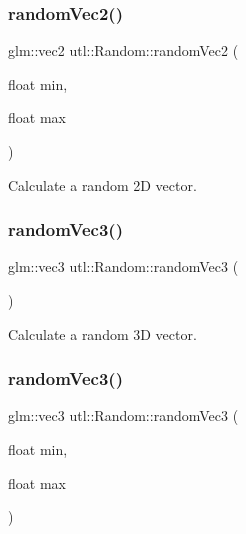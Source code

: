 \subsubsection{\texorpdfstring{random\+Vec2()}{randomVec2()}\hspace{0.1cm}{\footnotesize\ttfamily [2/2]}}
{\footnotesize\ttfamily glm\+::vec2 utl\+::\+Random\+::random\+Vec2 (\begin{DoxyParamCaption}\item[{float}]{min,  }\item[{float}]{max }\end{DoxyParamCaption})\hspace{0.3cm}{\ttfamily [static]}}

Calculate a random 2D vector. \mbox{\label{classutl_1_1_random_a6e2aaa6b6117cfe92312af1153adc808}} 
\subsubsection{\texorpdfstring{random\+Vec3()}{randomVec3()}\hspace{0.1cm}{\footnotesize\ttfamily [1/2]}}
{\footnotesize\ttfamily glm\+::vec3 utl\+::\+Random\+::random\+Vec3 (\begin{DoxyParamCaption}{ }\end{DoxyParamCaption})\hspace{0.3cm}{\ttfamily [static]}}

Calculate a random 3D vector. \mbox{\label{classutl_1_1_random_ae52ea617bc38ca85a9eb4cdc029b371c}} 
\subsubsection{\texorpdfstring{random\+Vec3()}{randomVec3()}\hspace{0.1cm}{\footnotesize\ttfamily [2/2]}}
{\footnotesize\ttfamily glm\+::vec3 utl\+::\+Random\+::random\+Vec3 (\begin{DoxyParamCaption}\item[{float}]{min,  }\item[{float}]{max }\end{DoxyParamCaption})\hspace{0.3cm}{\ttfamily [static]}}

